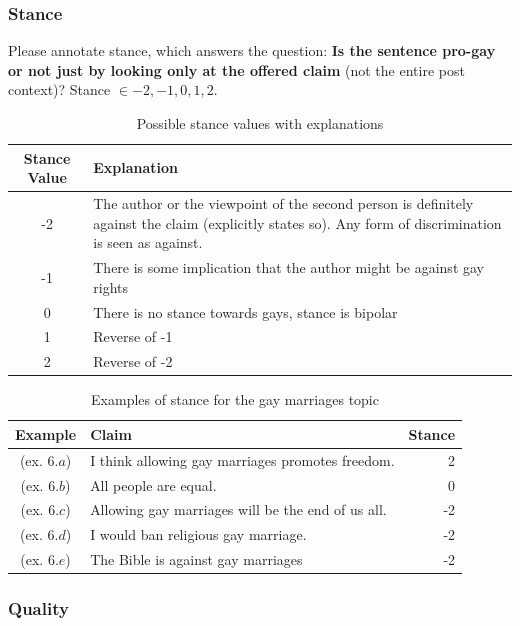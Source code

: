 \subsubsection*{Stance}

Please annotate stance, which answers the question:
\textbf{Is the sentence pro-gay or not just by looking only at the offered claim} (not
the entire post context)? Stance $\in {-2, -1, 0, 1, 2}$.

\begin{table}[!htb]
	\centering
\begin{tabular}{c p{10cm}}
\toprule
Stance Value & Explanation \\
\midrule
-2 & The author or the viewpoint of the second person is definitely against the
claim (explicitly states so). Any form of discrimination is seen as against.  \\
-1 & There is some implication that the author might be against gay rights  \\
0 & There is no stance towards gays, stance is bipolar \\
1 & Reverse of -1 \\
2 & Reverse of -2 \\
\bottomrule
\end{tabular}
\label{tab:stance}
\caption{Possible stance values with explanations}
\end{table}

\begin{table}[!htb]
	\centering
\begin{tabular}{c p{10cm} r}
\toprule
Example & Claim & Stance \\
\midrule
(ex. $6.a$) &  I think allowing gay marriages promotes freedom. & 2 \\
(ex. $6.b$) & All people are equal. & 0 \\
(ex. $6.c$) & Allowing gay marriages will be the end of us all. &  -2 \\
(ex. $6.d$) & I would ban religious gay marriage. & -2 \\
(ex. $6.e$) & The Bible is against gay marriages & -2 \\
\bottomrule
\end{tabular}
\label{tab:stance_example}
\caption{Examples of stance for the gay marriages topic}
\end{table}

\subsubsection*{Quality}


